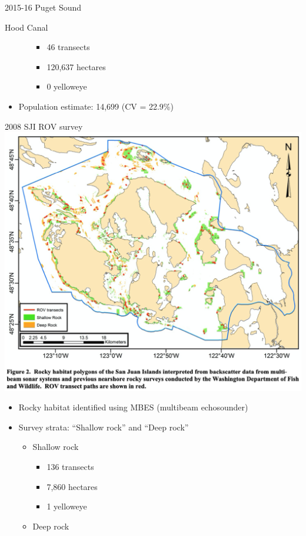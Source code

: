 \documentclass[
  ignorenonframetext,
]{beamer}
\providecommand{\tightlist}{%
  \setlength{\itemsep}{0pt}\setlength{\parskip}{0pt}}
\begin{document}
\begin{frame}{2015-16 Puget Sound}
\begin{block}{Hood Canal}
\begin{itemize}
\begin{itemize}
    \begin{itemize}
    \tightlist
    \item
      46 transects
    \item
      120,637 hectares
    \item
      0 yelloweye
    \end{itemize}
  \end{itemize}
\item
  Population estimate: 14,699 (CV = 22.9\%)
\end{itemize}
\end{block}
\end{frame}

\begin{frame}{2008 SJI ROV survey}
\protect\hypertarget{sji-rov-survey}{}
\includegraphics[width=1\textwidth,height=\textheight]{2008_SJI_map.png}

\begin{itemize}
\tightlist
\item
  Rocky habitat identified using MBES (multibeam echosounder)
\item
  Survey strata: ``Shallow rock'' and ``Deep rock''

  \begin{itemize}
  \tightlist
  \item
    Shallow rock

    \begin{itemize}
    \tightlist
    \item
      136 transects
    \item
      7,860 hectares
    \item
      1 yelloweye
    \end{itemize}
  \item
    Deep rock


\end{itemize}
\end{itemize}
\end{frame}
\end{document}
